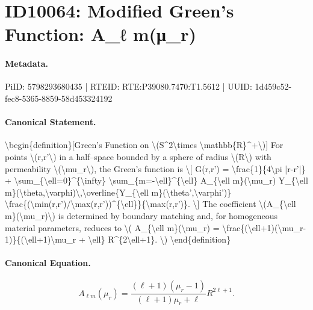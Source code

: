 \section*{ID10064: Modified Green’s Function: A\_ℓ m(μ\_r)}
\paragraph{Metadata.}
PiID: 5798293680435 | RTEID: RTE:P39080.7470:T1.5612 | UUID: 1d459c52-fec8-5365-8859-58d453324192

\paragraph{Canonical Statement.}
\textbackslash{}begin\{definition\}[Green’s Function on \textbackslash{}(S\textasciicircum{}2\textbackslash{}times \textbackslash{}mathbb\{R\}\textasciicircum{}+\textbackslash{})] For points \textbackslash{}(r,r'\textbackslash{}) in a half–space bounded by a sphere of radius \textbackslash{}(R\textbackslash{}) with permeability \textbackslash{}(\textbackslash{}mu\_r\textbackslash{}), the Green’s function is \textbackslash{}[ G(r,r') = \textbackslash{}frac\{1\}\{4\textbackslash{}pi |r-r'|\} + \textbackslash{}sum\_\{\textbackslash{}ell=0\}\textasciicircum{}\{\textbackslash{}infty\} \textbackslash{}sum\_\{m=-\textbackslash{}ell\}\textasciicircum{}\{\textbackslash{}ell\} A\_\{\textbackslash{}ell m\}(\textbackslash{}mu\_r) Y\_\{\textbackslash{}ell m\}(\textbackslash{}theta,\textbackslash{}varphi)\textbackslash{},\textbackslash{}overline\{Y\_\{\textbackslash{}ell m\}(\textbackslash{}theta',\textbackslash{}varphi')\} \textbackslash{}frac\{(\textbackslash{}min(r,r')/\textbackslash{}max(r,r'))\textasciicircum{}\{\textbackslash{}ell\}\}\{\textbackslash{}max(r,r')\}. \textbackslash{}] The coefficient \textbackslash{}(A\_\{\textbackslash{}ell m\}(\textbackslash{}mu\_r)\textbackslash{}) is determined by boundary matching and, for homogeneous material parameters, reduces to \textbackslash{}( A\_\{\textbackslash{}ell m\}(\textbackslash{}mu\_r) = \textbackslash{}frac\{(\textbackslash{}ell+1)(\textbackslash{}mu\_r-1)\}\{(\textbackslash{}ell+1)\textbackslash{}mu\_r + \textbackslash{}ell\} R\textasciicircum{}\{2\textbackslash{}ell+1\}. \textbackslash{}) \textbackslash{}end\{definition\}

\paragraph{Canonical Equation.}
\[
A_{\ell m}(\mu_r) = \frac{(\ell+1)(\mu_r-1)}{(\ell+1)\mu_r + \ell} R^{2\ell+1}.
\]


